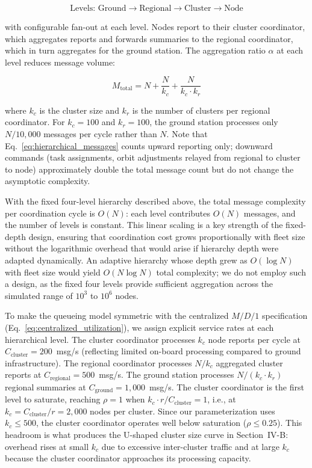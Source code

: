 \documentclass[journal]{IEEEtran}
\begin{document}
\begin{equation}
    \text{Levels: Ground} \to \text{Regional} \to \text{Cluster} \to \text{Node}
    \label{eq:hierarchy}
\end{equation}

\noindent with configurable fan-out at each level. Nodes report to their cluster coordinator, which aggregates reports and forwards summaries to the regional coordinator, which in turn aggregates for the ground station. The aggregation ratio $\alpha$ at each level reduces message volume:

\begin{equation}
    M_{\text{total}} = N + \frac{N}{k_c} + \frac{N}{k_c \cdot k_r}
    \label{eq:hierarchical_messages}
\end{equation}

\noindent where $k_c$ is the cluster size and $k_r$ is the number of clusters per regional coordinator. For $k_c = 100$ and $k_r = 100$, the ground station processes only $N/10{,}000$ messages per cycle rather than $N$. Note that Eq.~\ref{eq:hierarchical_messages} counts upward reporting only; downward commands (task assignments, orbit adjustments relayed from regional to cluster to node) approximately double the total message count but do not change the asymptotic complexity.

With the fixed four-level hierarchy described above, the total message complexity per coordination cycle is $O(N)$: each level contributes $O(N)$ messages, and the number of levels is constant. This linear scaling is a key strength of the fixed-depth design, ensuring that coordination cost grows proportionally with fleet size without the logarithmic overhead that would arise if hierarchy depth were adapted dynamically. An adaptive hierarchy whose depth grew as $O(\log N)$ with fleet size would yield $O(N \log N)$ total complexity; we do not employ such a design, as the fixed four levels provide sufficient aggregation across the simulated range of $10^3$ to $10^6$ nodes.

To make the queueing model symmetric with the centralized $M/D/1$ specification (Eq.~\ref{eq:centralized_utilization}), we assign explicit service rates at each hierarchical level. The cluster coordinator processes $k_c$ node reports per cycle at $C_{\text{cluster}} = 200$~msg/s (reflecting limited on-board processing compared to ground infrastructure). The regional coordinator processes $N/k_c$ aggregated cluster reports at $C_{\text{regional}} = 500$~msg/s. The ground station processes $N/(k_c \cdot k_r)$ regional summaries at $C_{\text{ground}} = 1{,}000$~msg/s. The cluster coordinator is the first level to saturate, reaching $\rho = 1$ when $k_c \cdot r / C_{\text{cluster}} = 1$, i.e., at $k_c = C_{\text{cluster}} / r = 2{,}000$ nodes per cluster. Since our parameterization uses $k_c \leq 500$, the cluster coordinator operates well below saturation ($\rho \leq 0.25$). This headroom is what produces the U-shaped cluster size curve in Section~IV-B: overhead rises at small $k_c$ due to excessive inter-cluster traffic and at large $k_c$ because the cluster coordinator approaches its processing capacity.
\end{document}
